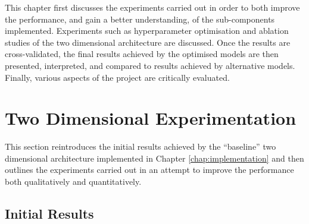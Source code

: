 This chapter first discusses the experiments carried out in order to both improve the performance, and gain a better understanding, of the sub-components implemented. Experiments such as hyperparameter optimisation and ablation studies of the two dimensional architecture are discussed. Once the results are cross-validated, the final results achieved by the optimised models are then presented, interpreted, and compared to results achieved by alternative models. Finally, various aspects of the project are critically evaluated.

\section{Two Dimensional Experimentation}

This section reintroduces the initial results achieved by the ``baseline'' two dimensional architecture implemented in Chapter \ref{chap:implementation} and then outlines the experiments carried out in an attempt to improve the performance both qualitatively and quantitatively.

\subsection{Initial Results}


